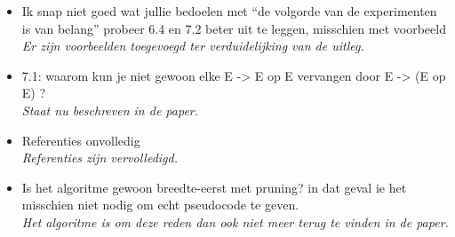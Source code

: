 \documentclass{article}
\begin{document}
\begin{itemize}
\item Ik snap niet goed wat jullie bedoelen met “de volgorde van de experimenten is van belang” probeer 6.4 en 7.2 beter uit te leggen, misschien met voorbeeld
\\	\textit{Er zijn voorbeelden toegevoegd ter verduidelijking van de uitleg.}
\item 7.1: waarom kun je niet gewoon elke E -> E op E vervangen door E -> (E op E) ?
\\	\textit{Staat nu beschreven in de paper.}
\item Referenties onvolledig
\\	\textit{Referenties zijn vervolledigd.}
\item Is het algoritme gewoon breedte-eerst met pruning? in dat geval ie het misschien niet nodig om echt pseudocode te geven.
\\	\textit{Het algoritme is om deze reden dan ook niet meer terug te vinden in de paper.}

\end{itemize}
\end{document}

